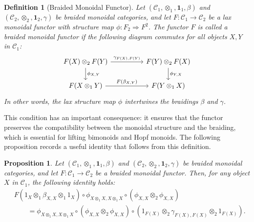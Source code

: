 \documentclass{amsart}
\newtheorem{proposition}{Proposition}[section]
\newtheorem{definition}{Definition}[section]
\begin{document}
\begin{definition}[Braided Monoidal Functor]\label{def:braided_functor}
Let $(\mathcal{C}_1, \otimes_1, \mathbf{1}_1, \beta)$ and $(\mathcal{C}_2, \otimes_2, \mathbf{1}_2, \gamma)$ be braided monoidal categories, and let $F \colon \mathcal{C}_1 \longrightarrow \mathcal{C}_2$ be a lax monoidal functor with structure map $\phi \colon F_2 \Rightarrow F^2$. The functor $F$ is called a braided monoidal functor if the following diagram commutes for all objects $X, Y$ in $\mathcal{C}_1$:
\[
\begin{tikzcd}
F(X)\otimes_2 F(Y)\arrow{d}{\phi_{X,Y}}\arrow{rr}{\gamma_{F(X),F(Y)}}&& F(Y)\otimes_2 F(X)\arrow{d}{\phi_{Y,X}}\\
F(X\otimes_1 Y)\arrow{rr}{F(\beta_{X,Y})}&&F(Y\otimes_1 X)
\end{tikzcd}
\]
In other words, the lax structure map $\phi$ intertwines the braidings $\beta$ and $\gamma$.
\end{definition}

This condition has an important consequence: it ensures that the functor preserves the compatibility between the monoidal structure and the braiding, which is essential for lifting bimonoids and Hopf monoids. The following proposition records a useful identity that follows from this definition.

\begin{proposition}\label{prop:braided_hexagon_identity}
Let $(\mathcal{C}_1, \otimes_1, \mathbf{1}_1, \beta)$ and $(\mathcal{C}_2, \otimes_2, \mathbf{1}_2, \gamma)$ be braided monoidal categories, and let $F \colon \mathcal{C}_1 \longrightarrow \mathcal{C}_2$ be a braided monoidal functor. Then, for any object $X$ in $\mathcal{C}_1$, the following identity holds:
\[
\begin{aligned}
&F(1_X \otimes_1 \beta_{X,X} \otimes_1 1_X) \circ \phi_{X\otimes_1 X, X\otimes_1 X} \circ (\phi_{X,X} \otimes_2 \phi_{X,X}) \\
&\qquad = \phi_{X\otimes_1 X, X\otimes_1 X} \circ (\phi_{X,X} \otimes_2 \phi_{X,X}) \circ (1_{F(X)} \otimes_2 \gamma_{F(X),F(X)} \otimes_2 1_{F(X)}).
\end{aligned}
\]
\end{proposition}
\end{document}
